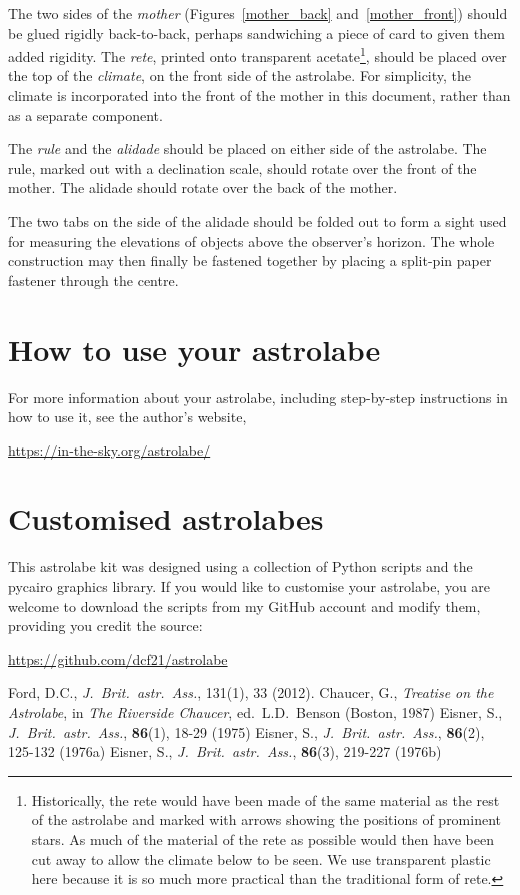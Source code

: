 \documentclass[a4paper,onecolumn,10pt]{article}
\begin{document}
The two sides of the {\it mother} (Figures~\ref{mother_back}
and~\ref{mother_front}) should be glued rigidly back-to-back, perhaps
sandwiching a piece of card to given them added rigidity. The {\it rete},
printed onto transparent acetate\footnote{Historically, the rete would have
been made of the same material as the rest of the astrolabe and marked with
arrows showing the positions of prominent stars. As much of the material of the
rete as possible would then have been cut away to allow the climate below to be
seen. We use transparent plastic here because it is so much more practical than
the traditional form of rete.}, should be placed over the top of the {\it
climate}, on the front side of the astrolabe. For simplicity, the climate is
incorporated into the front of the mother in this document, rather than as a
separate component.

The {\it rule} and the {\it alidade} should be placed on either side of the
astrolabe. The rule, marked out with a declination scale, should rotate over
the front of the mother. The alidade should rotate over the back of the mother.

The two tabs on the side of the alidade should be folded out to form a sight
used for measuring the elevations of objects above the observer's horizon. The
whole construction may then finally be fastened together by placing a split-pin
paper fastener through the centre.

\section*{How to use your astrolabe}

For more information about your astrolabe, including step-by-step instructions
in how to use it, see the author's website,

\url{https://in-the-sky.org/astrolabe/}

\section*{Customised astrolabes}

This astrolabe kit was designed using a collection of Python scripts and the
pycairo graphics library. If you would like to customise your astrolabe, you are
welcome to download the scripts from my GitHub account and modify them,
providing you credit the source:

\url{https://github.com/dcf21/astrolabe}

\begin{thebibliography}{9}
Ford, D.C., \textit{J.\ Brit.\ astr.\ Ass.}, 131(1), 33 (2012).
Chaucer, G., \textit{Treatise on the Astrolabe}, in {\it The Riverside Chaucer}, ed.\ L.D.\ Benson (Boston, 1987)
Eisner, S., \textit{J.\ Brit.\ astr.\ Ass.}, \textbf{86}(1), 18-29 (1975)
Eisner, S., \textit{J.\ Brit.\ astr.\ Ass.}, \textbf{86}(2), 125-132 (1976a)
Eisner, S., \textit{J.\ Brit.\ astr.\ Ass.}, \textbf{86}(3), 219-227 (1976b)
\end{thebibliography}
\end{document}
